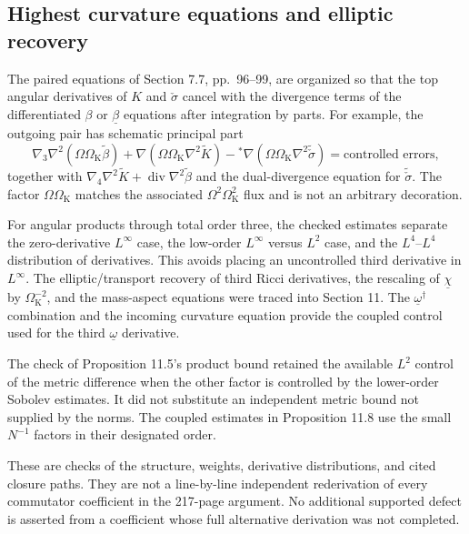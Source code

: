 \documentclass[10pt]{article}
\begin{document}
\subsection*{Highest curvature equations and elliptic recovery}
The paired equations of Section 7.7, pp. 96–99, are organized so that the top angular derivatives of \(K\) and \(\check\sigma\) cancel with the divergence terms of the differentiated \(\beta\) or \(\underline\beta\) equations after integration by parts. For example, the outgoing pair has schematic principal part \[\nabla_3\nabla^2(\Omega\Omega_{\mathrm K}\widetilde\beta)
    +\nabla(\Omega\Omega_{\mathrm K}\nabla^2\widetilde K)
    -{}^*\nabla(\Omega\Omega_{\mathrm K}\nabla^2\widetilde{\check\sigma})
        =\text{controlled errors},\] together with \(\nabla_4\nabla^2\widetilde K+
\operatorname{div}\nabla^2\widetilde\beta\) and the dual-divergence equation for \(\widetilde{\check\sigma}\). The factor \(\Omega\Omega_{\mathrm K}\) matches the associated \(\Omega^2\Omega_{\mathrm K}^2\) flux and is not an arbitrary decoration.\par
For angular products through total order three, the checked estimates separate the zero-derivative \(L^\infty\) case, the low-order \(L^\infty\) versus \(L^2\) case, and the \(L^4\)–\(L^4\) distribution of derivatives. This avoids placing an uncontrolled third derivative in \(L^\infty\). The elliptic/transport recovery of third Ricci derivatives, the rescaling of \(\underline\chi\) by \(\Omega_{\mathrm K}^{-2}\), and the mass-aspect equations were traced into Section 11. The \(\underline\omega^\dagger\) combination and the incoming curvature equation provide the coupled control used for the third \(\underline\omega\) derivative.\par
The check of Proposition 11.5’s product bound retained the available \(L^2\) control of the metric difference when the other factor is controlled by the lower-order Sobolev estimates. It did not substitute an independent metric bound not supplied by the norms. The coupled estimates in Proposition 11.8 use the small \(N^{-1}\) factors in their designated order.\par
These are checks of the structure, weights, derivative distributions, and cited closure paths. They are not a line-by-line independent rederivation of every commutator coefficient in the 217-page argument. No additional supported defect is asserted from a coefficient whose full alternative derivation was not completed.\par
\end{document}
